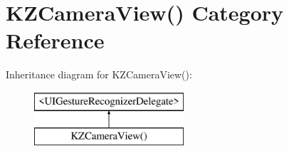 \hypertarget{category_k_z_camera_view_07_08}{}\section{K\+Z\+Camera\+View() Category Reference}
\label{category_k_z_camera_view_07_08}
Inheritance diagram for K\+Z\+Camera\+View()\+:\begin{figure}[H]
\begin{center}
\leavevmode
\includegraphics[height=2.000000cm]{category_k_z_camera_view_07_08}
\end{center}
\end{figure}
